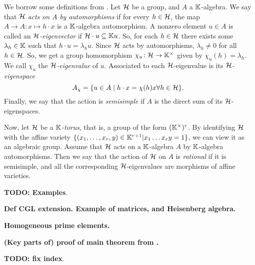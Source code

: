 \documentclass{article}
\begin{document}
We borrow some definitions from \cite{GoodearlBrown2002LecturesAQC}. Let $\mathcal{H}$ be a
group, and $A$ a $\mathbb{K}$-algebra. We say that $\mathcal{H}$ \emph{acts on $A$ by
	automorphisms} if for every $h \in \mathcal{H}$, the map $A \to
	A \colon x \mapsto h \cdot x$ is a $\mathbb{K}$-algebra automorphism. A nonzero element $u
	\in A$ is called an \emph{$\mathcal{H}$-eigenvector} if $\mathcal{H}
	\cdot u \subseteq \mathbb{K} u$. So, for each $h \in \mathcal{H}$ there exists some $\lambda_h \in
	\mathbb{K}$ such that $h \cdot u = \lambda_h u$. Since $\mathcal{H}$ acts by automorphisms,
$\lambda_h \neq 0$ for all $h \in \mathcal{H}$. So, we get a group homomorphism $\chi_u \colon
	\mathcal{H} \to \mathbb{K}^\times$ given by $\chi_u(h) = \lambda_h$. We call $\chi_u$ the
\emph{$\mathcal{H}$-eigenvalue} of $u$. Associated to each
$\mathcal{H}$-eigenvalue is its \emph{$\mathcal{H}$-eigenspace}
\begin{equation*}
	A_\chi = \{u \in A \mid h \cdot x = \chi(h)x \forall h \in \mathcal{H} \}.
\end{equation*}
Finally, we say that the action is \emph{semisimple} if $A$ is the direct sum of its $\mathcal{H}$-eigenspaces.

Now, let $\mathcal{H}$ be a \emph{$\mathbb{K}$-torus}, that is, a group of the form
$(\mathbb{K}^\times)^r$. By identifying $\mathcal{H}$ with the affine variety $\{(x_1, \dots, x_r,
	y) \in \mathbb{K}^{r+1} | x_1 \dots x_r y = 1\}$, we can view it as an algebraic group.
Assume that $\mathcal{H}$ acts on a $\mathbb{K}$-algebra $A$ by $\mathbb{K}$-algebra automorphisms. Then
we say that the action of $\mathcal{H}$ on $A$ is \emph{rational} if it
is semisimple, and all the corresponding $\mathcal{H}$-eigenvalues are morphisms of affine
varieties.

\textbf{TODO: Examples}.

\textbf{Def CGL extension. Example of matrices, and Heisenberg algebra.}

\textbf{Homogeneous prime elements.}

\textbf{(Key parts of) proof of main theorem from \cite{GoodearlYakimov2017QCA}.}

\textbf{TODO: fix index}.


\end{document}
